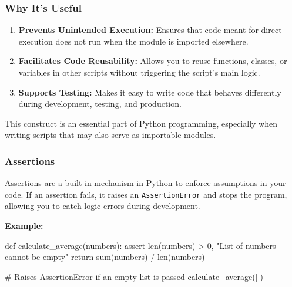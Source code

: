\documentclass[
  letterpaper,
  DIV=11,
  numbers=noendperiod]{scrreprt}
\newenvironment{Shaded}{\begin{snugshade}}{\end{snugshade}}
\newcommand{\BuiltInTok}[1]{\textcolor[rgb]{0.00,0.23,0.31}{#1}}
\newcommand{\CommentTok}[1]{\textcolor[rgb]{0.37,0.37,0.37}{#1}}
\newcommand{\ControlFlowTok}[1]{\textcolor[rgb]{0.00,0.23,0.31}{#1}}
\newcommand{\DecValTok}[1]{\textcolor[rgb]{0.68,0.00,0.00}{#1}}
\newcommand{\KeywordTok}[1]{\textcolor[rgb]{0.00,0.23,0.31}{#1}}
\newcommand{\NormalTok}[1]{\textcolor[rgb]{0.00,0.23,0.31}{#1}}
\newcommand{\OperatorTok}[1]{\textcolor[rgb]{0.37,0.37,0.37}{#1}}
\newcommand{\StringTok}[1]{\textcolor[rgb]{0.13,0.47,0.30}{#1}}
\providecommand{\tightlist}{%
  \setlength{\itemsep}{0pt}\setlength{\parskip}{0pt}}\usepackage{longtable,booktabs,array}
\begin{document}
\begin{tcolorbox}
\hypertarget{why-its-useful}{%
\subsubsection{Why It's Useful}\label{why-its-useful}}

\begin{enumerate}
\def\labelenumi{\arabic{enumi}.}
\tightlist
\item
  \textbf{Prevents Unintended Execution:} Ensures that code meant for
  direct execution does not run when the module is imported elsewhere.
\item
  \textbf{Facilitates Code Reusability:} Allows you to reuse functions,
  classes, or variables in other scripts without triggering the script's
  main logic.
\item
  \textbf{Supports Testing:} Makes it easy to write code that behaves
  differently during development, testing, and production.
\end{enumerate}

This construct is an essential part of Python programming, especially
when writing scripts that may also serve as importable modules.

\end{tcolorbox}

\hypertarget{assertions}{%
\subsubsection{Assertions}\label{assertions}}

Assertions are a built-in mechanism in Python to enforce assumptions in
your code. If an assertion fails, it raises an \texttt{AssertionError}
and stops the program, allowing you to catch logic errors during
development.

\textbf{Example:}

\begin{Shaded}
\begin{Highlighting}[]
\KeywordTok{def}\NormalTok{ calculate\_average(numbers):}
    \ControlFlowTok{assert} \BuiltInTok{len}\NormalTok{(numbers) }\OperatorTok{\textgreater{}} \DecValTok{0}\NormalTok{, }\StringTok{"List of numbers cannot be empty"}
    \ControlFlowTok{return} \BuiltInTok{sum}\NormalTok{(numbers) }\OperatorTok{/} \BuiltInTok{len}\NormalTok{(numbers)}

\CommentTok{\# Raises AssertionError if an empty list is passed}
\NormalTok{calculate\_average([])}
\end{Highlighting}
\end{Shaded}
\end{document}
